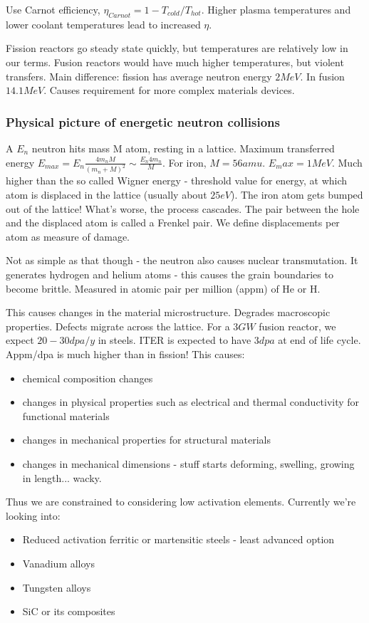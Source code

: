 \documentclass[PlasmaNotes.tex]{subfiles}
\begin{document}
Use Carnot efficiency, $\eta_{Carnot} = 1 - T_{cold}/T_{hot}$. Higher plasma temperatures and lower coolant temperatures lead to increased $\eta$.

Fission reactors go steady state quickly, but temperatures are relatively low in our terms. Fusion reactors would have much higher temperatures, but violent transfers. Main difference: fission has average neutron energy $2 MeV$. In fusion $14.1 MeV$. Causes requirement for more complex materials devices.

\subsubsection{Physical picture of energetic neutron collisions}

A $E_n$ neutron hits mass M atom, resting in a lattice. Maximum transferred energy $E_{max} = E_n \frac{4 m_n M}{(m_n+M)^2} \sim \frac{E_n 4 m_n}{M}$. For iron, $M=56 amu$. $E_max = 1 MeV$. Much higher than the so called Wigner energy - threshold value for energy, at which atom is displaced in the lattice (usually about $25 eV$). The iron atom gets bumped out of the lattice! What's worse, the process cascades. The pair between the hole and the displaced atom is called a Frenkel pair. We define displacements per atom as measure of damage.

Not as simple as that though - the neutron also causes nuclear transmutation. It generates hydrogen and helium atoms - this causes the grain boundaries to become brittle. Measured in atomic pair per million (appm) of He or H.

This causes changes in the material microstructure. Degrades macroscopic properties. Defects migrate across the lattice. For a $3 GW$ fusion reactor, we expect $20-30 dpa/y$ in steels. ITER is expected to have $3dpa$ at end of life cycle. Appm/dpa is much higher than in fission! This causes:
\begin{itemize}
 \item chemical composition changes
 \item changes in physical properties such as electrical and thermal conductivity for functional materials
 \item changes in mechanical properties for structural materials
 \item changes in mechanical dimensions - stuff starts deforming, swelling, growing in length... wacky.
\end{itemize}

Thus we are constrained to considering low activation elements. Currently we're looking into:
\begin{itemize}
 \item Reduced activation ferritic or martensitic steels - least advanced option
 \item Vanadium alloys
 \item Tungsten alloys
 \item SiC or its composites
\end{itemize}
\end{document}
